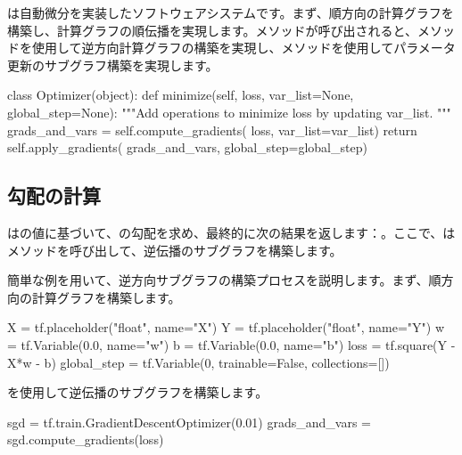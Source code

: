 \begin{content}

\tf{}は自動微分を実装したソフトウェアシステムです。まず、順方向の計算グラフを構築し、計算グラフの順伝播を実現します。メソッドが呼び出されると、メソッドを使用して逆方向計算グラフの構築を実現し、メソッドを使用してパラメータ更新のサブグラフ構築を実現します。

\begin{leftbar}
\begin{python}
class Optimizer(object):
  def minimize(self, loss, var_list=None, global_step=None):
    """Add operations to minimize loss by updating var_list.
    """
    grads_and_vars = self.compute_gradients(
      loss, var_list=var_list)
    return self.apply_gradients(
      grads_and_vars, 
      global_step=global_step)
\end{python}
\end{leftbar}

\subsection{勾配の計算}

はの値に基づいて、の勾配を求め、最終的に次の結果を返します：。ここで、はメソッドを呼び出して、逆伝播のサブグラフを構築します。

簡単な例を用いて、逆方向サブグラフの構築プロセスを説明します。まず、順方向の計算グラフを構築します。

\begin{leftbar}
\begin{python}
X = tf.placeholder("float", name="X")
Y = tf.placeholder("float", name="Y")
w = tf.Variable(0.0, name="w")
b = tf.Variable(0.0, name="b")
loss = tf.square(Y - X*w - b)
global_step = tf.Variable(0, trainable=False, collections=[])
\end{python}
\end{leftbar}

を使用して逆伝播のサブグラフを構築します。

\begin{leftbar}
\begin{python}
sgd = tf.train.GradientDescentOptimizer(0.01)
grads_and_vars = sgd.compute_gradients(loss)
\end{python}
\end{leftbar}


\end{content}
